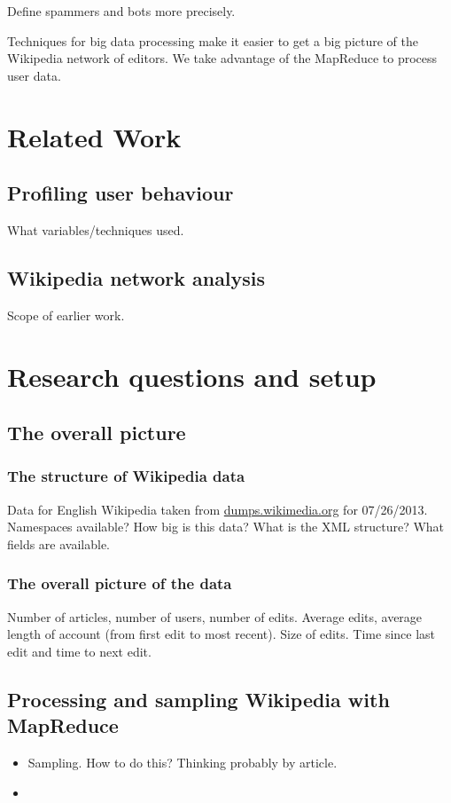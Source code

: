 \documentclass{article}
\begin{document}
Define spammers and bots more precisely.

Techniques for big data processing make it easier to get a big picture of the Wikipedia network of editors. We take advantage of the MapReduce to process user data.

\section{Related Work}
\subsection{Profiling user behaviour}
What variables/techniques used.
\subsection{Wikipedia network analysis}
Scope of earlier work.

\section{Research questions and setup}

\subsection{The overall picture}
\subsubsection{The structure of Wikipedia data} Data for English Wikipedia taken from \url{dumps.wikimedia.org} for 07/26/2013. Namespaces available? How big is this data? What is the XML structure? What fields are available.
\subsubsection{The overall picture of the data} Number of articles, number of users, number of edits. Average edits, average length of account (from first edit to most recent). Size of edits. Time since last edit and time to next edit.

\subsection{Processing and sampling Wikipedia with MapReduce}
\begin{itemize}
\item Sampling. How to do this? Thinking probably by article.
\item 
\end{itemize}
\end{document}
